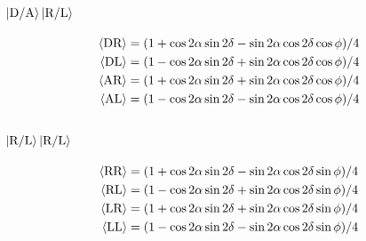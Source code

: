 \documentclass{paper}[11pt]
\begin{document}
	\subsection{$\ket{\text{D/A}}\ket{\text{R/L}}$}
	\begin{align}
		{\langle{\text{DR}}\rangle} &= (1+\cos2\alpha\sin2\delta - \sin2\alpha\cos2\delta\cos\phi)/4 \\
		{\langle{\text{DL}}\rangle} &= (1-\cos2\alpha\sin2\delta + \sin2\alpha\cos2\delta\cos\phi)/4 \\
		{\langle{\text{AR}}\rangle} &= (1+\cos2\alpha\sin2\delta + \sin2\alpha\cos2\delta\cos\phi)/4 \\
		{\langle{\text{AL}}\rangle} &= (1-\cos2\alpha\sin2\delta - \sin2\alpha\cos2\delta\cos\phi)/4
	\end{align}
	\subsection{$\ket{\text{R/L}}\ket{\text{R/L}}$}
	\begin{align}
		{\langle{\text{RR}}\rangle} &= (1+\cos2\alpha\sin2\delta - \sin2\alpha\cos2\delta\sin\phi)/4 \\
		{\langle{\text{RL}}\rangle} &= (1-\cos2\alpha\sin2\delta + \sin2\alpha\cos2\delta\sin\phi)/4 \\
		{\langle{\text{LR}}\rangle} &= (1+\cos2\alpha\sin2\delta + \sin2\alpha\cos2\delta\sin\phi)/4 \\
		{\langle{\text{LL}}\rangle} &= (1-\cos2\alpha\sin2\delta - \sin2\alpha\cos2\delta\sin\phi)/4
	\end{align}
\end{document}
